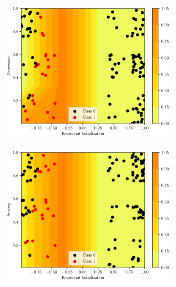 \documentclass[conference]{IEEEtran}
\theoremstyle{definition}
\theoremstyle{remark}
\theoremstyle{remark}
\begin{document}
\begin{figure}
    \begin{subfigure}[b]{0.32\textwidth}
        \centering
        \includegraphics[width=\textwidth]{figs/tree-contour-2-3.pdf}
        \caption{}
    \end{subfigure}
    \begin{subfigure}[b]{0.32\textwidth}
        \centering
        \includegraphics[width=\textwidth]{figs/tree-contour-2-4.pdf}
        \caption{}
    \end{subfigure}
    \begin{subfigure}[b]{0.32\textwidth}
        \centering

\end{subfigure}
\end{figure}
\end{document}
